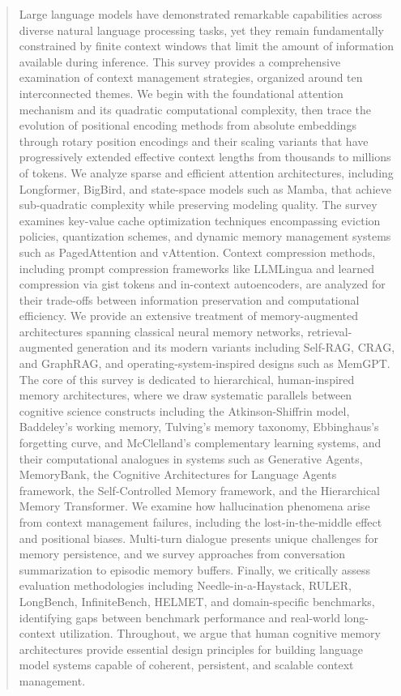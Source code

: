 \documentclass[11pt,letterpaper]{article}
\begin{document}
\begin{abstract}
\noindent
Large language models have demonstrated remarkable capabilities across diverse natural language processing tasks, yet they remain fundamentally constrained by finite context windows that limit the amount of information available during inference. This survey provides a comprehensive examination of context management strategies, organized around ten interconnected themes. We begin with the foundational attention mechanism and its quadratic computational complexity, then trace the evolution of positional encoding methods from absolute embeddings through rotary position encodings and their scaling variants that have progressively extended effective context lengths from thousands to millions of tokens. We analyze sparse and efficient attention architectures, including Longformer, BigBird, and state-space models such as Mamba, that achieve sub-quadratic complexity while preserving modeling quality. The survey examines key-value cache optimization techniques encompassing eviction policies, quantization schemes, and dynamic memory management systems such as PagedAttention and vAttention. Context compression methods, including prompt compression frameworks like LLMLingua and learned compression via gist tokens and in-context autoencoders, are analyzed for their trade-offs between information preservation and computational efficiency. We provide an extensive treatment of memory-augmented architectures spanning classical neural memory networks, retrieval-augmented generation and its modern variants including Self-RAG, CRAG, and GraphRAG, and operating-system-inspired designs such as MemGPT. The core of this survey is dedicated to hierarchical, human-inspired memory architectures, where we draw systematic parallels between cognitive science constructs including the Atkinson-Shiffrin model, Baddeley's working memory, Tulving's memory taxonomy, Ebbinghaus's forgetting curve, and McClelland's complementary learning systems, and their computational analogues in systems such as Generative Agents, MemoryBank, the Cognitive Architectures for Language Agents framework, the Self-Controlled Memory framework, and the Hierarchical Memory Transformer. We examine how hallucination phenomena arise from context management failures, including the lost-in-the-middle effect and positional biases. Multi-turn dialogue presents unique challenges for memory persistence, and we survey approaches from conversation summarization to episodic memory buffers. Finally, we critically assess evaluation methodologies including Needle-in-a-Haystack, RULER, LongBench, InfiniteBench, HELMET, and domain-specific benchmarks, identifying gaps between benchmark performance and real-world long-context utilization. Throughout, we argue that human cognitive memory architectures provide essential design principles for building language model systems capable of coherent, persistent, and scalable context management.
\end{abstract}
\end{document}
